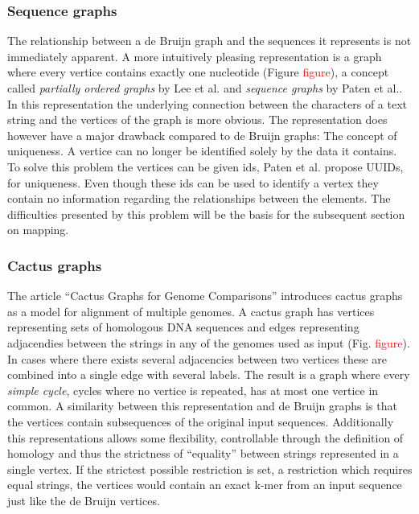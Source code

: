 \documentclass[thesis.tex]{subfiles}
\begin{document}
\subsubsection{Sequence graphs}
\label{sec:sequence_graphs}
The relationship between a de Bruijn graph and the sequences it represents is not immediately apparent. A more intuitively pleasing representation is a graph where every vertice contains exactly one nucleotide (Figure \textcolor{red}{figure}), a concept called \textit{partially ordered graphs} by Lee et al.\cite{improved_genome_inference_in_the_mhc_using_a_population_reference_graph} and \textit{sequence graphs} by Paten et al.\cite{mapping_to_a_reference_genome_structure}. In this representation the underlying connection between the characters of a text string and the vertices of the graph is more obvious. The representation does however have a major drawback compared to de Bruijn graphs: The concept of uniqueness. A vertice can no longer be identified solely by the data it contains. To solve this problem the vertices can be given ids, Paten et al. propose UUIDs, for uniqueness. Even though these ids can be used to identify a vertex they contain no information regarding the relationships between the elements. The difficulties presented by this problem will be the basis for the subsequent section on mapping. 
\subsubsection{Cactus graphs}
The article ``Cactus Graphs for Genome Comparisons'' introduces cactus graphs as a model for alignment of multiple genomes. A cactus graph has vertices representing sets of homologous DNA sequences and edges representing adjacendies between the strings in any of the genomes used as input (Fig. \textcolor{red}{figure}). In cases where there exists several adjacencies between two vertices these are combined into a single edge with several labels. The result is a graph where every \textit{simple cycle}, cycles where no vertice is repeated, has at most one vertice in common. A similarity between this representation and de Bruijn graphs is that the vertices contain subsequences of the original input sequences. Additionally this representations allows some flexibility, controllable through the definition of homology and thus the strictness of ``equality'' between strings represented in a single vertex. If the strictest possible restriction is set, a restriction which requires equal strings, the vertices would contain an exact k-mer from an input sequence just like the de Bruijn vertices. 
\end{document}
